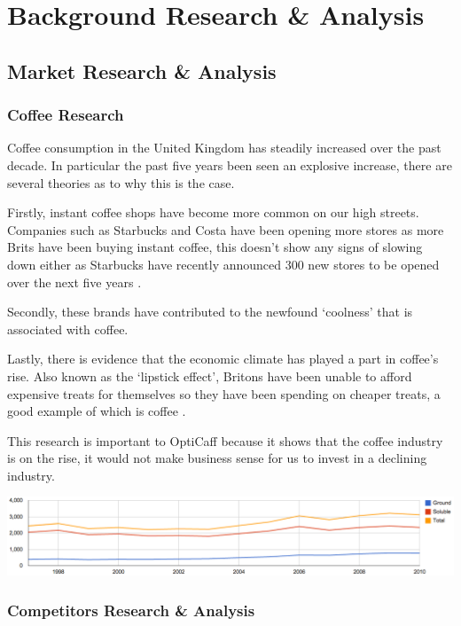 \section{Background Research \& Analysis}

\subsection{Market Research \& Analysis}

\subsubsection{Coffee Research}
Coffee consumption in the United Kingdom has steadily increased over the past decade. In particular the past five years been seen an explosive increase, there are several theories as to why this is the case.

Firstly, instant coffee shops have become more common on our high streets. Companies such as Starbucks and Costa have been opening more stores as more Brits have been buying instant coffee, this doesn’t show any signs of slowing down either as Starbucks have recently announced 300 new stores to be opened over the next five years \cite{starbucks}.

Secondly, these brands have contributed to the newfound ‘coolness’ that is associated with coffee. 

Lastly, there is evidence that the economic climate has played a part in coffee’s rise. Also known as the ‘lipstick effect’, Britons have been unable to afford expensive treats for themselves so they have been spending on cheaper treats, a good example of which is coffee \cite{costa}.

This research is important to OptiCaff because it shows that the coffee industry is on the rise, it would not make business sense for us to invest in a declining industry.

\begin{center}
\includegraphics[trim = 0mm 0mm 0mm 0mm, clip, scale=0.4]{images/CaffeineGraph.png}
\end{center}

\subsubsection{Competitors Research \& Analysis}
\label{sec:competitors}
